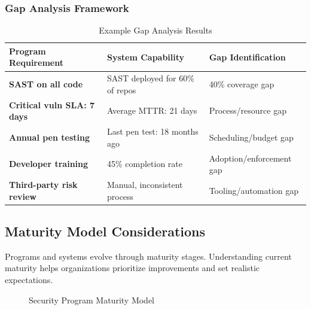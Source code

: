 \documentclass[11pt,letterpaper]{article}
\begin{document}
\subsubsection{Gap Analysis Framework}

\begin{table}[H]
\centering
\renewcommand{\arraystretch}{1.3}
\begin{tabularx}{\textwidth}{>{\bfseries}p{3cm} X X}
\toprule
\textbf{Program Requirement} & \textbf{System Capability} & \textbf{Gap Identification} \\
\midrule
SAST on all code & SAST deployed for 60\% of repos & 40\% coverage gap \\
Critical vuln SLA: 7 days & Average MTTR: 21 days & Process/resource gap \\
Annual pen testing & Last pen test: 18 months ago & Scheduling/budget gap \\
Developer training & 45\% completion rate & Adoption/enforcement gap \\
Third-party risk review & Manual, inconsistent process & Tooling/automation gap \\
\bottomrule
\end{tabularx}
\caption{Example Gap Analysis Results}
\label{tab:gap-analysis}
\end{table}

\subsection{Maturity Model Considerations}

Programs and systems evolve through maturity stages. Understanding current maturity helps organizations prioritize improvements and set realistic expectations.

\begin{figure}[H]
\centering
{}
\caption{Security Program Maturity Model}
\label{fig:maturity-model}
\end{figure}
\end{document}
